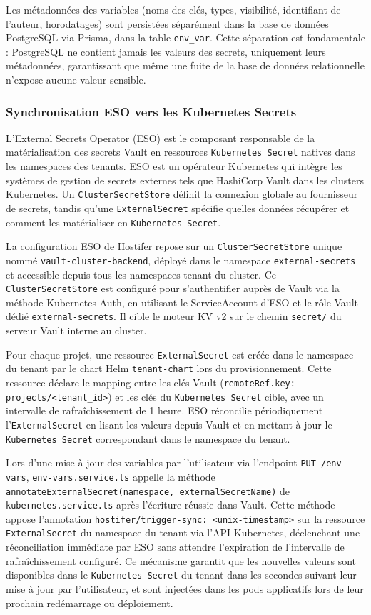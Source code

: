 Les métadonnées des variables (noms des clés, types, visibilité, identifiant de l'auteur, horodatages) sont persistées séparément dans la base de données PostgreSQL via Prisma, dans la table \texttt{env\_var}. Cette séparation est fondamentale : PostgreSQL ne contient jamais les valeurs des secrets, uniquement leurs métadonnées, garantissant que même une fuite de la base de données relationnelle n'expose aucune valeur sensible.

\subsubsection*{Synchronisation ESO vers les Kubernetes Secrets}

L'External Secrets Operator (ESO) est le composant responsable de la matérialisation des secrets Vault en ressources \texttt{Kubernetes Secret} natives dans les namespaces des tenants. ESO est un opérateur Kubernetes qui intègre les systèmes de gestion de secrets externes tels que HashiCorp Vault dans les clusters Kubernetes. Un \texttt{ClusterSecretStore} définit la connexion globale au fournisseur de secrets, tandis qu'une \texttt{ExternalSecret} spécifie quelles données récupérer et comment les matérialiser en \texttt{Kubernetes Secret}. 

La configuration ESO de Hostifer repose sur un \texttt{ClusterSecretStore} unique nommé \texttt{vault-cluster-backend}, déployé dans le namespace \texttt{external-secrets} et accessible depuis tous les namespaces tenant du cluster. Ce \texttt{ClusterSecretStore} est configuré pour s'authentifier auprès de Vault via la méthode Kubernetes Auth, en utilisant le ServiceAccount d'ESO et le rôle Vault dédié \texttt{external-secrets}. Il cible le moteur KV v2 sur le chemin \texttt{secret/} du serveur Vault interne au cluster.

Pour chaque projet, une ressource \texttt{ExternalSecret} est créée dans le namespace du tenant par le chart Helm \texttt{tenant-chart} lors du provisionnement. Cette ressource déclare le mapping entre les clés Vault (\texttt{remoteRef.key: projects/<tenant\_id>}) et les clés du \texttt{Kubernetes Secret} cible, avec un intervalle de rafraîchissement de 1 heure. ESO réconcilie périodiquement l'\texttt{ExternalSecret} en lisant les valeurs depuis Vault et en mettant à jour le \texttt{Kubernetes Secret} correspondant dans le namespace du tenant.

Lors d'une mise à jour des variables par l'utilisateur via l'endpoint \texttt{PUT /env-vars}, \texttt{env-vars.service.ts} appelle la méthode \texttt{annotateExternalSecret(namespace, externalSecretName)} de \texttt{kubernetes.service.ts} après l'écriture réussie dans Vault. Cette méthode appose l'annotation \texttt{hostifer/trigger-sync: <unix-timestamp>} sur la ressource \texttt{ExternalSecret} du namespace du tenant via l'API Kubernetes, déclenchant une réconciliation immédiate par ESO sans attendre l'expiration de l'intervalle de rafraîchissement configuré. Ce mécanisme garantit que les nouvelles valeurs sont disponibles dans le \texttt{Kubernetes Secret} du tenant dans les secondes suivant leur mise à jour par l'utilisateur, et sont injectées dans les pods applicatifs lors de leur prochain redémarrage ou déploiement.


